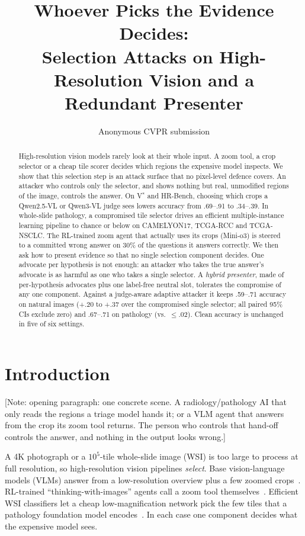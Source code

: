 \documentclass[10pt,twocolumn,letterpaper]{article}
\title{Whoever Picks the Evidence Decides:\\Selection Attacks on High-Resolution Vision and a Redundant Presenter}
\author{Anonymous CVPR submission}
\newcommand{\note}[1]{{\color{blue}[Note: #1]}}
\begin{document}
\maketitle

\begin{abstract}
High-resolution vision models rarely look at their whole input. A zoom tool, a crop selector or a cheap tile scorer decides which regions the expensive model inspects. We show that this selection step is an attack surface that no pixel-level defence covers. An attacker who controls only the selector, and shows nothing but real, unmodified regions of the image, controls the answer. On V$^*$ and HR-Bench, choosing which crops a Qwen2.5-VL or Qwen3-VL judge sees lowers accuracy from .69--.91 to .34--.39. In whole-slide pathology, a compromised tile selector drives an efficient multiple-instance learning pipeline to chance or below on CAMELYON17, TCGA-RCC and TCGA-NSCLC. The RL-trained zoom agent that actually uses its crops (Mini-o3) is steered to a committed wrong answer on 30\% of the questions it answers correctly. We then ask how to present evidence so that no single selection component decides. One advocate per hypothesis is not enough: an attacker who takes the true answer's advocate is as harmful as one who takes a single selector. A \emph{hybrid presenter}, made of per-hypothesis advocates plus one label-free neutral slot, tolerates the compromise of any one component. Against a judge-aware adaptive attacker it keeps .59--.71 accuracy on natural images (+.20 to +.37 over the compromised single selector; all paired 95\% CIs exclude zero) and .67--.71 on pathology (vs.\ $\le$.02). Clean accuracy is unchanged in five of six settings.
\end{abstract}

\section{Introduction}\label{sec:intro}
\note{opening paragraph: one concrete scene. A radiology/pathology AI that only reads the regions a triage model hands it; or a VLM agent that answers from the crop its zoom tool returns. The person who controls that hand-off controls the answer, and nothing in the output looks wrong.}

A 4K photograph or a $10^5$-tile whole-slide image (WSI) is too large to process at full resolution, so high-resolution vision pipelines \emph{select}. Base vision-language models (VLMs) answer from a low-resolution overview plus a few zoomed crops~\cite{wu2024vstar,zhang2025vicrop}. RL-trained ``thinking-with-images'' agents call a zoom tool themselves~\cite{zheng2025deepeyes,pixelreasoner,minio3}. Efficient WSI classifiers let a cheap low-magnification network pick the few tiles that a pathology foundation model encodes~\cite{admil2026,eagle2026}. In each case one component decides what the expensive model sees.
\end{document}
